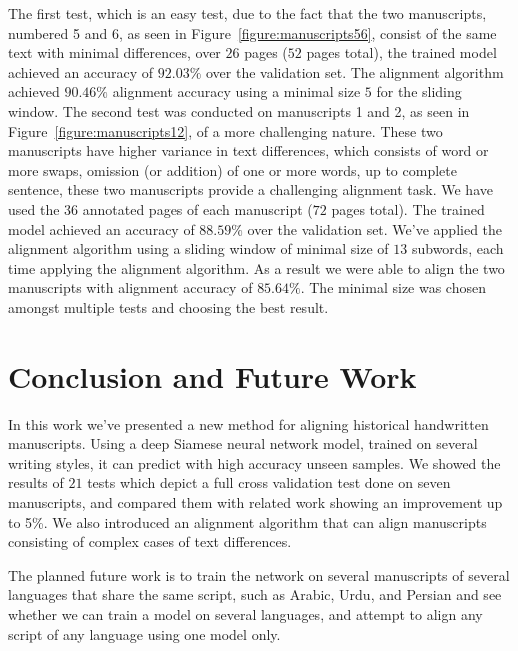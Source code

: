 \documentclass[10pt, a4paper, conference, compsocconf]{IEEEtran}
\begin{document}
The first test, which is an easy test, due to the fact that the two manuscripts, numbered 5 and 6, as seen in Figure~\ref{figure:manuscripts56}, consist of the same text with minimal differences, over $26$ pages ($52$ pages total), the trained model achieved an accuracy of $92.03\%$ over the validation set. The alignment algorithm achieved $90.46\%$ alignment accuracy using a minimal size $5$ for the sliding window. The second test was conducted on manuscripts 1 and 2, as seen in Figure~\ref{figure:manuscripts12}, of a more challenging nature. These two manuscripts have higher variance in text differences, which consists of word or more swaps, omission (or addition) of one or more words, up to complete sentence, these two manuscripts provide a challenging alignment task. We have used the $36$ annotated pages of each manuscript ($72$ pages total). The trained model achieved an accuracy of $88.59\%$ over the validation set. We've applied the alignment algorithm using a sliding window of minimal size of $13$ subwords, each time applying the alignment algorithm. As a result we were able to align the two manuscripts with alignment accuracy of $85.64\%$. The minimal size was chosen amongst multiple tests and choosing the best result.
\section{Conclusion and Future Work}
In this work we've presented a new method for aligning historical handwritten manuscripts. Using a deep Siamese neural network model, trained on several writing styles, it can predict with high accuracy unseen samples. We showed the results of $21$ tests which depict a full cross validation test done on seven manuscripts, and compared them with related work showing an improvement up to 5\%. We also introduced an alignment algorithm that can align manuscripts consisting of complex cases of text differences.

The planned future work is to train the network on several manuscripts of several languages that share the same script, such as Arabic, Urdu, and Persian and see whether we can train a model on several languages, and attempt to align any script of any language using one model only.


\end{document}
